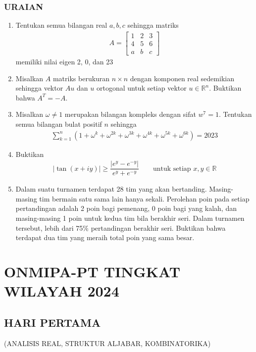 \documentclass[12pt,twoside]{article}
\newcommand{\R}{\mathbb{R}}
\begin{document}
\subsubsection*{URAIAN}
\begin{enumerate}
	\item  Tentukan semua bilangan real $a,b,c$ sehingga matriks
	      \begin{align*}
		      A=\begin{bmatrix}
			        1 & 2 & 3 \\
			        4 & 5 & 6 \\
			        a & b & c
		        \end{bmatrix}
	      \end{align*}
	      memiliki nilai eigen 2, 0, dan 23
	\item Misalkan $A$ matriks berukuran $n\times n$ dengan komponen real sedemikian sehingga vektor $Au$ dan $u$ ortogonal untuk setiap vektor $u\in\R^n$.
	      Buktikan bahwa $A^T=-A$.
	\item Misalkan $\omega\neq 1$ merupakan bilangan kompleks dengan sifat $w^7=1$. Tentukan semua bilangan bulat positif $n$ sehingga
	      \begin{align*}
		      \sum_{k=1}^n (1+\omega^k+\omega^{2k}+\omega^{3k}+\omega^{4k}+\omega^{5k}+\omega^{6k})=2023
	      \end{align*}
	\item Buktikan
	      \begin{align*}
		      |\tan(x+iy)| \geq \dfrac{|e^y-e^{-y}|}{e^y+e^{-y}} \qquad \text{untuk setiap } x,y\in \R
	      \end{align*}
	\item Dalam suatu turnamen terdapat 28 tim yang akan bertanding. Masing-masing tim bermain satu sama lain hanya sekali. Perolehan poin pada setiap pertandingan adalah 2 poin bagi pemenang, 0 poin bagi yang kalah, dan masing-masing 1 poin untuk kedua tim bila berakhir seri. Dalam turnamen tersebut, lebih dari 75\% pertandingan berakhir seri. Buktikan bahwa terdapat dua tim yang meraih total poin yang sama besar.
\end{enumerate}

\newpage
{}
\section{ONMIPA-PT TINGKAT WILAYAH 2024}
\subsection{HARI PERTAMA}
\begin{center}
	(ANALISIS REAL, STRUKTUR ALJABAR, KOMBINATORIKA)
\end{center}
\end{document}
